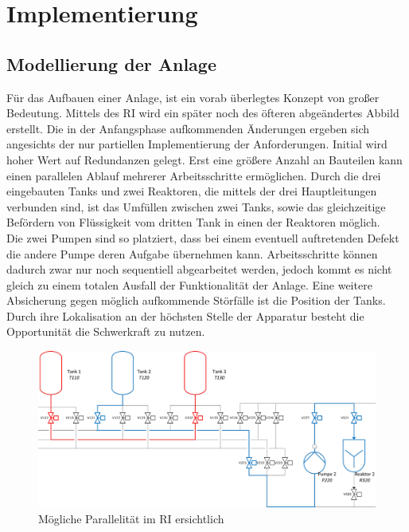 \chapter{Implementierung} \label{chapter:thevetestcase}
\section{Modellierung der Anlage}
Für das Aufbauen einer Anlage, ist ein vorab überlegtes Konzept von großer Bedeutung. Mittels des \ac{RI} wird ein später noch des öfteren abgeändertes Abbild erstellt. Die in der Anfangsphase aufkommenden Änderungen ergeben sich angesichts der nur partiellen Implementierung der Anforderungen. Initial wird hoher Wert auf Redundanzen gelegt. Erst eine größere Anzahl an Bauteilen kann einen parallelen Ablauf mehrerer Arbeitsschritte ermöglichen. Durch die drei eingebauten Tanks und zwei Reaktoren, die mittels der drei Hauptleitungen verbunden sind, ist das Umfüllen zwischen zwei Tanks, sowie das gleichzeitige Befördern von Flüssigkeit vom dritten Tank in einen der Reaktoren möglich.\\

Die zwei Pumpen sind so platziert, dass bei einem eventuell auftretenden Defekt die andere Pumpe deren Aufgabe übernehmen kann. Arbeitsschritte können dadurch zwar nur noch sequentiell abgearbeitet werden, jedoch kommt es nicht gleich zu einem totalen Ausfall der Funktionalität der Anlage. Eine weitere Absicherung gegen möglich aufkommende Störfälle ist die Position der Tanks. Durch ihre Lokalisation an der höchsten Stelle der Apparatur besteht die Opportunität die Schwerkraft zu nutzen.\\

\begin{figure}[h!]
  \centering
  \includegraphics[width=1\textwidth]{graphics/implementation/RI_Impl_cropped.jpg}
  \caption{Mögliche Parallelität im \ac{RI} ersichtlich}
\end{figure}


